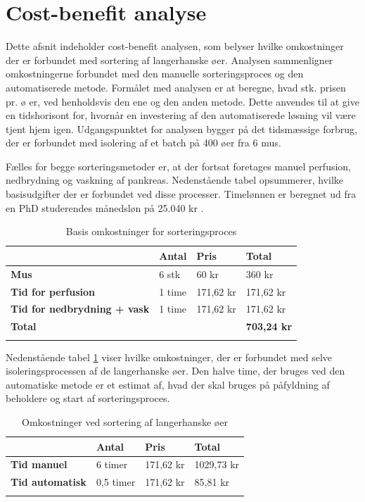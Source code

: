 \newpage
\section{Cost-benefit analyse}
Dette afsnit indeholder cost-benefit analysen, som belyser hvilke omkostninger der er forbundet med sortering af langerhanske øer. Analysen sammenligner omkostningerne forbundet med den manuelle sorteringsproces og den automatiserede metode. Formålet med analysen er at beregne, hvad stk. prisen pr. ø er, ved henholdsvis den ene og den anden metode. Dette anvendes til at give en tidshorisont for, hvornår en investering af den automatiserede løsning vil være tjent hjem igen. Udgangspunktet for analysen bygger på det tidsmæssige forbrug, der er forbundet med isolering af et batch på 400 øer fra 6 mus. 

Fælles for begge sorteringsmetoder er, at der fortsat foretages manuel perfusion, nedbrydning og vaskning af pankreas. Nedenstående tabel opsummerer, hvilke basisudgifter der er forbundet ved disse processer. Timelønnen er beregnet ud fra en PhD studerendes månedsløn på 25.040 kr \citep{phdwage}.
\begin{center}
		\begin{longtable}{ | m{6cm} | m{1.5cm} | m{1.5cm} | m{3cm}| } 
			\hline
			 &\textbf{Antal} & \textbf{Pris} & \textbf{Total}\\ 
			\hline
			 \textbf{Mus} & 6 stk & 60 kr & 360 kr\\ 
			\hline
			 \textbf{Tid for perfusion} & 1 time & 171,62 kr & 171,62 kr\\ 
			\hline
			\textbf{Tid for nedbrydning + vask} & 1 time & 171,62 kr & 171,62 kr\\ 
			\hline	
			\textbf{Total} &  &  & \textbf{703,24 kr}\\ 
			\hline
			\caption{Basis omkostninger for sorteringsproces}
			 		\end{longtable}
\end{center}
Nedenstående tabel \ref{tab:sortcost} viser hvilke omkostninger, der er forbundet med selve isoleringsprocessen af de langerhanske øer. Den halve time, der bruges ved den automatiske metode er et estimat af, hvad der skal bruges på påfyldning af beholdere og start af sorteringsproces. 
\begin{center}
		\begin{longtable}{ | m{6cm} | m{1.5cm} | m{1.5cm} | m{3cm}| } 
			\hline
			 &\textbf{Antal} & \textbf{Pris} & \textbf{Total}\\ 
			\hline
			 \textbf{Tid manuel} & 6 timer & 171,62 kr & 1029,73 kr\\ 
			\hline
			 \textbf{Tid automatisk} & 0,5 timer & 171,62 kr & 85,81 kr\\ 
			\hline
			\caption{Omkostninger ved sortering af langerhanske øer}
			\label{tab:sortcost}
			 		\end{longtable}
\end{center}

